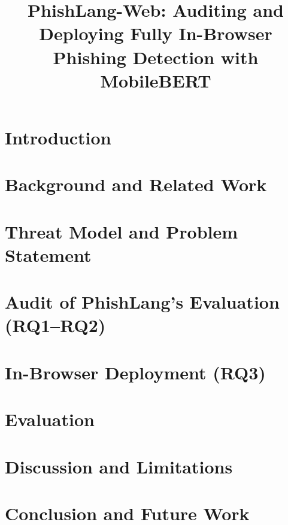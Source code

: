 \documentclass[conference]{IEEEtran}
\begin{document}
\title{PhishLang-Web: Auditing and Deploying Fully In-Browser Phishing Detection with MobileBERT}

\author{
}

\maketitle

\begin{abstract}
\end{abstract}

\section{Introduction}

\section{Background and Related Work}

\section{Threat Model and Problem Statement}

\section{Audit of PhishLang's Evaluation (RQ1--RQ2)}

\section{In-Browser Deployment (RQ3)}

\section{Evaluation}

\section{Discussion and Limitations}

\section{Conclusion and Future Work}

\nocite{*} %


\end{document}
